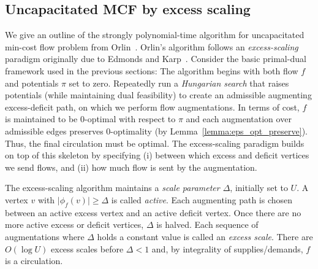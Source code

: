 \documentclass[a4paper,UKenglish]{socg-lipics-v2018}
\def\abs#1{\mathopen| #1 \mathclose|}		%
\def\fsupply{\phi}
\theoremstyle{plain}
\numberwithin{figure}{section}
\def\EMPH#1{\textcolor{BrickRed}{{\emph{#1}}}}
\begin{document}
\begin{toappendix}
\subsection{Uncapacitated MCF by excess scaling}
\label{SSA:orlin}

We give an outline of the strongly polynomial-time algorithm for uncapacitated min-cost flow problem
from Orlin~\cite{O93}.
Orlin's algorithm follows an \EMPH{excess-scaling} paradigm originally due to
Edmonds and Karp~\cite{EK72}.
Consider the basic primal-dual framework used in the previous sections:
The algorithm begins with both flow $f$ and potentials $\pi$ set to zero.
Repeatedly run a \emph{Hungarian search} that raises potentials (while maintaining dual
feasibility) to create an admissible augmenting excess-deficit path, on which
we perform flow augmentations.
In terms of cost, $f$ is maintained to be $0$-optimal with respect to $\pi$
and each augmentation over admissible edges preserves $0$-optimality (by Lemma~\ref{lemma:eps_opt_preserve}).
Thus, the final circulation must be optimal.
The excess-scaling paradigm builds on top of this skeleton by specifying (i) between which
excess and deficit vertices we send flows, and (ii) how much flow is sent by the
augmentation.

The excess-scaling algorithm maintains a \EMPH{scale parameter $\Delta$},
initially set to $U$.
A vertex $v$ with $\abs{\fsupply_f(v)} \geq \Delta$ is called \EMPH{active}.
Each augmenting path is chosen between an active excess vertex and an active
deficit vertex.
Once there are no more active excess or deficit vertices,
$\Delta$ is halved.
Each sequence of augmentations where $\Delta$ holds a constant value is called
an \EMPH{excess scale}.
There are $O(\log U)$ excess scales before $\Delta < 1$ and, by integrality of
supplies/demands, $f$ is a circulation.


\end{toappendix}
\end{document}
